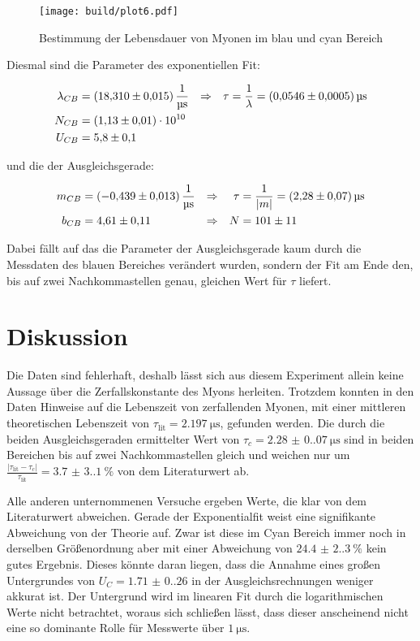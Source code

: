 \begin{figure}[H]
	\centering
	\texttt{[image: build/plot6.pdf]}
	\caption{Bestimmung der Lebensdauer von Myonen im blau und cyan Bereich}\label{fig:plt6}
\end{figure}

\newpage
Diesmal sind die Parameter des exponentiellen Fit:

\begin{align}
	\lambda_{CB}&=\qty{18.31(0.015)}{\per\us} &\Rightarrow & & \tau&=\frac{1}{\lambda }=\qty{0.0546(0.0005)}{\us} \\ 
	N_{CB}&=\num{1.13(0.1)e10} \notag \\
	U_{CB}&=\num{5.8(1)} \notag
\end{align}

und die der Ausgleichsgerade:

\begin{align}
	m_{CB}&=\qty{-0.439(0.013)}{\per\us} &\Rightarrow & & \tau&=\frac{1}{|m|}=\qty{2.28(0.07)}{\us} \\ \label{eq:good_tau}
	b_{CB}&=\num{4.61(0.11)} &\Rightarrow & & N&=\num{101(11)} \notag
\end{align}

Dabei fällt auf das die Parameter der Ausgleichsgerade kaum durch die Messdaten des blauen Bereiches verändert wurden, 
sondern der Fit am Ende den, bis auf zwei Nachkommastellen genau, gleichen Wert für $\tau $ liefert. 

\newpage
\section{Diskussion}
Die Daten sind fehlerhaft, deshalb lässt sich aus diesem Experiment allein keine Aussage über die Zerfallskonstante des
Myons herleiten. Trotzdem konnten in den Daten Hinweise auf die Lebenszeit von zerfallenden Myonen, 
mit einer mittleren theoretischen Lebenszeit von $\tau_\text{lit} = \qty{2.197}{\micro\s}$\cite{Workman:2022ynf}, gefunden werden. 
Die durch die beiden Ausgleichsgeraden ermittelter Wert von $\tau_c= \qty{2.28(0.07)}{\us}$ sind in beiden Bereichen bis auf zwei Nachkommastellen gleich und weichen nur um 
$\frac{|\tau_\text{lit} - \tau_c|}{\tau_\text{lit}} = \qty{3.7(3.1)}{\percent}$ von dem Literaturwert ab. 

Alle anderen unternommenen Versuche ergeben Werte, die klar von dem Literaturwert abweichen.
Gerade der Exponentialfit weist eine signifikante Abweichung von der Theorie auf. 
Zwar ist diese im Cyan Bereich immer noch in derselben Größenordnung aber mit einer Abweichung von $\qty{24.4(2.3)}{\percent}$ kein gutes Ergebnis.
Dieses könnte daran liegen, dass die Annahme eines großen Untergrundes von $U_C=\num{1.71(0.26)}$ in der Ausgleichsrechnungen weniger akkurat ist.
Der Untergrund wird im linearen Fit durch die logarithmischen Werte nicht betrachtet, woraus sich schließen lässt, 
dass dieser anscheinend nicht eine so dominante Rolle für Messwerte über $\qty{1}{\us} $. 

